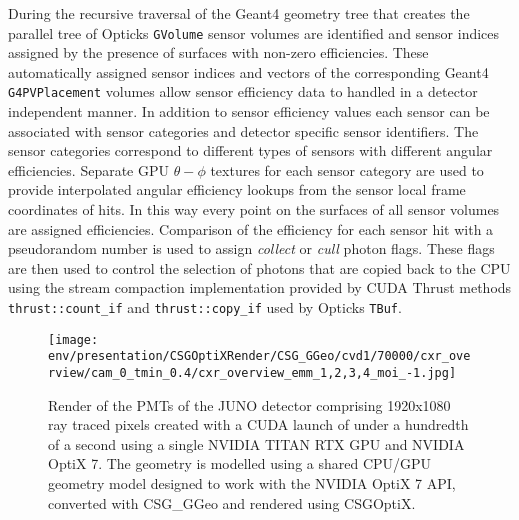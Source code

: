 \documentclass{webofc}
\begin{document}
During the recursive traversal of the Geant4 geometry tree that creates the parallel tree of Opticks {\tt GVolume}
sensor volumes are identified and sensor indices assigned by the presence of surfaces with non-zero efficiencies. 
These automatically assigned sensor indices and vectors of the corresponding Geant4 {\tt G4PVPlacement} volumes 
allow sensor efficiency data to handled in a detector independent manner. In addition to sensor efficiency values 
each sensor can be associated with sensor categories and detector specific sensor identifiers. The sensor categories
correspond to different types of sensors with different angular efficiencies.  Separate GPU $\theta-\phi$ textures 
for each sensor category are used to provide interpolated angular efficiency lookups from the sensor local 
frame coordinates of hits. In this way every point on the surfaces of all sensor volumes are assigned efficiencies.
Comparison of the efficiency for each sensor hit with a pseudorandom number is used to assign {\it collect} or {\it cull} 
photon flags. These flags are then used to control the selection of photons that are copied back to the CPU 
using the stream compaction implementation provided by CUDA Thrust\cite{thrust} methods {\tt thrust::count\_if} and 
{\tt thrust::copy\_if} used by Opticks {\tt TBuf}. 
%       
%
%
\begin{figure}
\centering
\texttt{[image: env/presentation/CSGOptiXRender/CSG\_GGeo/cvd1/70000/cxr\_overview/cam\_0\_tmin\_0.4/cxr\_overview\_emm\_1,2,3,4\_moi\_-1.jpg]}
\caption{Render of the PMTs of the JUNO detector comprising 1920x1080 ray traced pixels created with a CUDA launch of under a hundredth of a second  
using a single NVIDIA TITAN RTX GPU and NVIDIA OptiX 7.
The geometry is modelled using a shared CPU/GPU geometry model\cite{csgfoundry} 
designed to work with the NVIDIA OptiX 7 API, converted with CSG\_GGeo\cite{csgggeo} and rendered using CSGOptiX\cite{csgoptix}.
\label{j1808}}
\end{figure}
%
%
\end{document}
